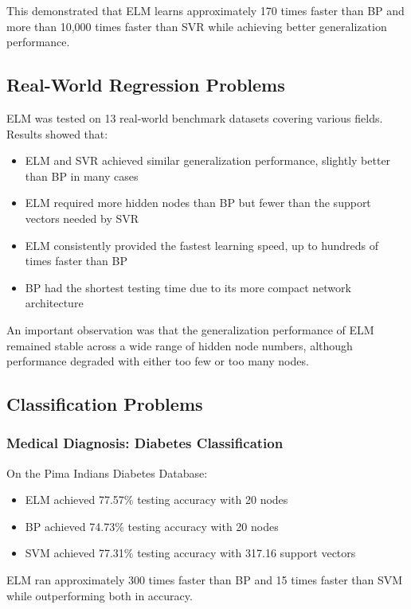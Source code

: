 \documentclass[11pt]{article}
\begin{document}
This demonstrated that ELM learns approximately 170 times faster than BP and more than 10,000 times faster than SVR while achieving better generalization performance.

\subsection{Real-World Regression Problems}

ELM was tested on 13 real-world benchmark datasets covering various fields. Results showed that:
\begin{itemize}
    \item ELM and SVR achieved similar generalization performance, slightly better than BP in many cases
    \item ELM required more hidden nodes than BP but fewer than the support vectors needed by SVR
    \item ELM consistently provided the fastest learning speed, up to hundreds of times faster than BP
    \item BP had the shortest testing time due to its more compact network architecture
\end{itemize}

An important observation was that the generalization performance of ELM remained stable across a wide range of hidden node numbers, although performance degraded with either too few or too many nodes.

\subsection{Classification Problems}

\subsubsection{Medical Diagnosis: Diabetes Classification}

On the Pima Indians Diabetes Database:
\begin{itemize}
    \item ELM achieved 77.57\% testing accuracy with 20 nodes
    \item BP achieved 74.73\% testing accuracy with 20 nodes
    \item SVM achieved 77.31\% testing accuracy with 317.16 support vectors
\end{itemize}

ELM ran approximately 300 times faster than BP and 15 times faster than SVM while outperforming both in accuracy.
\end{document}
